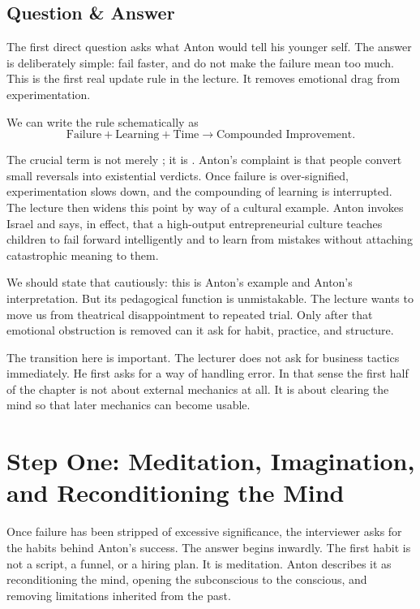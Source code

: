 \subsection{Question \& Answer}

The first direct question asks what Anton would tell his younger self. The answer is deliberately simple: fail faster, and do not make the failure mean too much. This is the first real update rule in the lecture. It removes emotional drag from experimentation.

We can write the rule schematically as
\begin{equation}
\text{Failure} + \text{Learning} + \text{Time} \to \text{Compounded Improvement}.
\end{equation}

The crucial term is not merely ; it is . Anton's complaint is that people convert small reversals into existential verdicts. Once failure is over-signified, experimentation slows down, and the compounding of learning is interrupted. The lecture then widens this point by way of a cultural example. Anton invokes Israel and says, in effect, that a high-output entrepreneurial culture teaches children to fail forward intelligently and to learn from mistakes without attaching catastrophic meaning to them.

We should state that cautiously: this is Anton's example and Anton's interpretation. But its pedagogical function is unmistakable. The lecture wants to move us from theatrical disappointment to repeated trial. Only after that emotional obstruction is removed can it ask for habit, practice, and structure.

The transition here is important. The lecturer does not ask for business tactics immediately. He first asks for a way of handling error. In that sense the first half of the chapter is not about external mechanics at all. It is about clearing the mind so that later mechanics can become usable.

\section{Step One: Meditation, Imagination, and Reconditioning the Mind}

Once failure has been stripped of excessive significance, the interviewer asks for the habits behind Anton's success. The answer begins inwardly. The first habit is not a script, a funnel, or a hiring plan. It is meditation. Anton describes it as reconditioning the mind, opening the subconscious to the conscious, and removing limitations inherited from the past.

